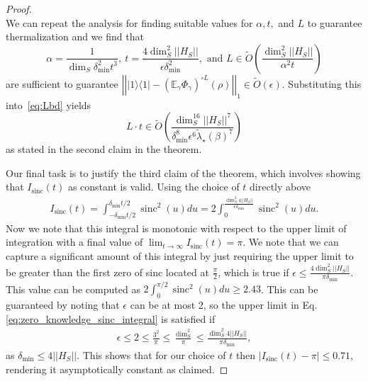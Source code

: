 \documentclass[
 amsmath,amssymb,
 aps,
onecolumn, 
nofootinbib]{revtex4-2}
\newcommand{\ketbra}[2]{| #1\rangle\! \langle #2|}
\newcommand{\norm}[1]{\left|\left| #1 \right|\right|}
\newcommand{\EE}{\mathbb{E}}
\newcommand{\bigotilde}[1]{\widetilde{O} \left( #1 \right)}
\DeclareMathOperator{\sinc}{sinc}
\begin{document}
\begin{proof}
\begin{equation}
    \end{equation}
    We can repeat the analysis for finding suitable values for $\alpha, t, $ and $L$ to guarantee thermalization and we find that 
    \begin{equation}
        \alpha = \frac{1}{\dim_S \delta_{\min}^2 t^3}, ~ t = \frac{4 \dim_S^2 \norm{H_S}}{\epsilon \delta_{\min}^2}, \text{ and } L \in \bigotilde{\frac{\dim_S^2 \norm{H_S}}{\alpha^2 t}}
    \end{equation}
    are sufficient to guarantee $\norm{\ketbra{1}{1} - \left( \EE_\gamma \Phi_\gamma\right)^{\circ L} (\rho)}_1 \in \bigotilde{\epsilon}$.  Substituting this into~\eqref{eq:Lbd} yields
    \begin{equation}
        L\cdot t \in \bigotilde{\frac{\dim_S^{16} \norm{H_S}^7}{\delta_{\min}^8 \epsilon^6 \widetilde{\lambda}_\star(\beta)^7}}
    \end{equation}
    as stated in the second claim in the theorem.

    Our final task is to justify the third claim of the theorem, which involves showing that $I_{\sinc}(t)$ as constant is valid. Using the choice of $t$ directly above
    \begin{align}
        I_{\sinc}(t) = \int_{-\delta_{\min} t /2}^{\delta_{\min} t /2}  \sinc^2(u) du = 2 \int_{0}^{ \frac{\dim_S^2 4 \norm{H_S}} {\epsilon \delta_{\min}}} \sinc^2(u) du. \label{eq:zero_knowledge_sinc_integral}
    \end{align}
    Now we note that this integral is monotonic with respect to the upper limit of integration with a final value of $\lim_{t \to \infty} I_{\sinc}(t) = \pi$. We note that we can capture a significant amount of this integral by just requiring the upper limit to be greater than the first zero of sinc located at $\frac{\pi}{2}$, which is true if $\epsilon \le \frac{4 \dim_S^2 \norm{H_S}}{\pi \delta_{\min}}$. This value can be computed as $2 \int_0^{\pi / 2} \sinc^2(u) du \ge 2.43$. This can be guaranteed by noting that $\epsilon$ can be at most 2, so the upper limit in Eq. \eqref{eq:zero_knowledge_sinc_integral} is satisfied if
    \begin{align}
    \epsilon \le 2 \le \frac{3^2}{\pi} \le \frac{\dim_S^2}{\pi} \le \frac{\dim_S^2 4 \norm{H_S}}{\pi \delta_{\min}},
\end{align}
as $\delta_{\min} \le 4 \norm{H_S}$. This shows that for our choice of $t$ then $|I_{\sinc}(t) - \pi| \le 0.71$, rendering it asymptotically constant as claimed.
\end{proof}
\end{document}
